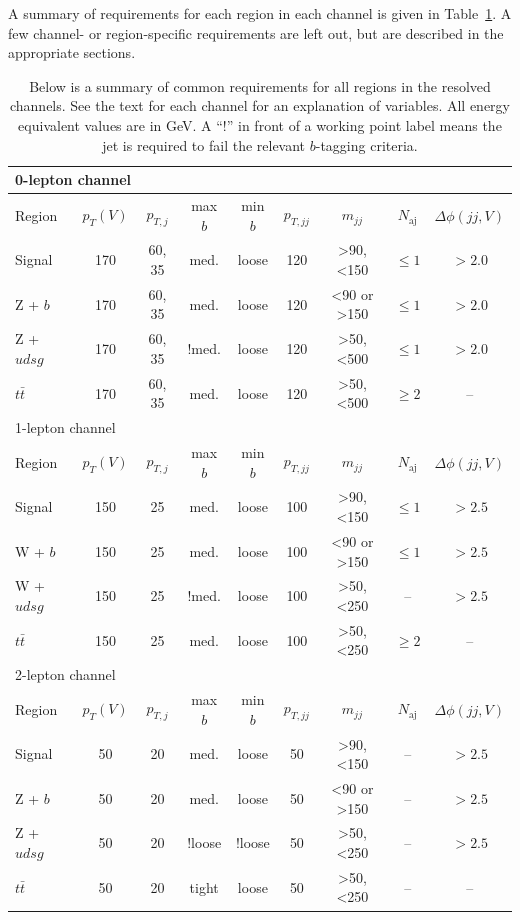 A summary of requirements for each region in each channel
is given in Table~\ref{tab:resolved}.
A few channel- or region-specific requirements are left out,
but are described in the appropriate sections.
\begin{table}
  \centering
  \caption[Summary of resolved selection requirements]{
    Below is a summary of common requirements for all regions in the resolved channels.
    See the text for each channel for an explanation of variables.
    All energy equivalent values are in GeV.
    A ``!'' in front of a working point label means the jet is required to fail the relevant $b$-tagging criteria.
  }
  \begin{tabular}{|l|c|c|c|c|c|c|c|c|}
    \hline
    \multicolumn{9}{|l|}{0-lepton channel} \\
    \hline
    Region & $p_T(V)$ & $p_{T,j}$ & max $b$ & min $b$ & $p_{T,jj}$ & $m_{jj}$ & $N_\textrm{aj}$ & $\Delta\phi(jj, V)$ \\
    \hline
    Signal & 170 & 60, 35 & med. & loose & 120 & >90, <150 & $\le 1$ & $> 2.0$ \\
    Z + $b$ & 170 & 60, 35 & med. & loose & 120 & <90 or >150 & $\le 1$ & $> 2.0$ \\
    Z + $udsg$ & 170 & 60, 35 & !med. & loose & 120 & >50, <500 & $\le 1$ & $> 2.0$ \\
    $t\bar{t}$ & 170 & 60, 35 & med. & loose & 120 & >50, <500 & $\ge 2$ & -- \\
    \hline
    \hline
    \multicolumn{9}{|l|}{1-lepton channel} \\
    \hline
    Region & $p_T(V)$ & $p_{T,j}$ & max $b$ & min $b$ & $p_{T,jj}$ & $m_{jj}$ & $N_\textrm{aj}$ & $\Delta\phi(jj, V)$ \\
    \hline
    Signal & 150 & 25 & med. & loose & 100 & >90, <150 & $\le 1$ & $> 2.5$ \\
    W + $b$ & 150 & 25 & med. & loose & 100 & <90 or >150 & $\le 1$ & $> 2.5$ \\
    W + $udsg$ & 150 & 25 & !med. & loose & 100 & >50, <250 & -- & $> 2.5$ \\
    $t\bar{t}$ & 150 & 25 & med. & loose & 100 & >50, <250 & $\ge 2$ & -- \\
    \hline
    \hline
    \multicolumn{9}{|l|}{2-lepton channel} \\
    \hline
    Region & $p_T(V)$ & $p_{T,j}$ & max $b$ & min $b$ & $p_{T,jj}$ & $m_{jj}$ & $N_\textrm{aj}$ & $\Delta\phi(jj, V)$ \\
    \hline
    Signal & 50 & 20 & med. & loose & 50 & >90, <150 & -- & $> 2.5$ \\
    Z + $b$ & 50 & 20 & med. & loose & 50 & <90 or >150 & -- & $> 2.5$ \\
    Z + $udsg$ & 50 & 20 & !loose & !loose & 50 & >50, <250 & -- & $> 2.5$ \\
    $t\bar{t}$ & 50 & 20 & tight & loose & 50 & >50, <250 & -- & -- \\
    \hline
  \end{tabular}
  \label{tab:resolved}
\end{table}
